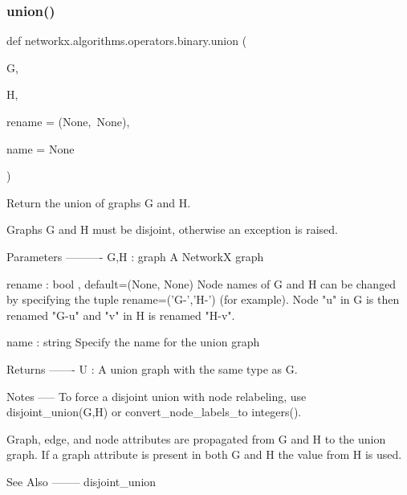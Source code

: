 \subsubsection{\texorpdfstring{union()}{union()}}
{\footnotesize\ttfamily def networkx.\+algorithms.\+operators.\+binary.\+union (\begin{DoxyParamCaption}\item[{}]{G,  }\item[{}]{H,  }\item[{}]{rename = {\ttfamily (None,~None)},  }\item[{}]{name = {\ttfamily None} }\end{DoxyParamCaption})}

\begin{DoxyVerb}Return the union of graphs G and H.

Graphs G and H must be disjoint, otherwise an exception is raised.

Parameters
----------
G,H : graph
   A NetworkX graph

rename : bool , default=(None, None)
   Node names of G and H can be changed by specifying the tuple
   rename=('G-','H-') (for example).  Node "u" in G is then renamed
   "G-u" and "v" in H is renamed "H-v".

name : string
   Specify the name for the union graph

Returns
-------
U : A union graph with the same type as G.

Notes
-----
To force a disjoint union with node relabeling, use
disjoint_union(G,H) or convert_node_labels_to integers().

Graph, edge, and node attributes are propagated from G and H
to the union graph.  If a graph attribute is present in both
G and H the value from H is used.

See Also
--------
disjoint_union
\end{DoxyVerb}
 